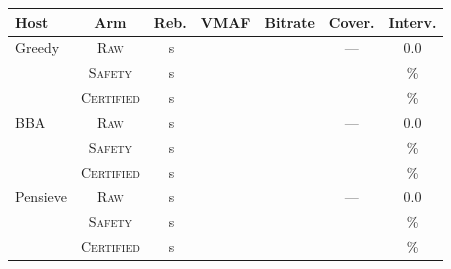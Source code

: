\begin{tabularx}{\linewidth}{@{}>{\raggedright\arraybackslash}X c ccccc@{}}
\toprule
\textbf{Host} & \textbf{Arm} & \textbf{Reb.} & \textbf{VMAF} & \textbf{Bitrate} & \textbf{Cover.} & \textbf{Interv.} \\
\midrule
Greedy & \textsc{Raw} & \CPSGreedyRawReb{}\,s & \CPSGreedyRawVM{} & \CPSGreedyRawBr{} & --- & 0.0\\
 & \textsc{Safety} & \CPSGreedySafReb{}\,s & \CPSGreedySafVM{} & \CPSGreedySafBr{} & \CPSGreedySafCov{} & \CPSGreedySafInt{}\%\\
 & \textsc{Certified} & \CPSGreedyCertReb{}\,s & \CPSGreedyCertVM{} & \CPSGreedyCertBr{} & \CPSGreedyCertCov{} & \CPSGreedyCertInt{}\%\\
\midrule
BBA & \textsc{Raw} & \CPSBbaRawReb{}\,s & \CPSBbaRawVM{} & \CPSBbaRawBr{} & --- & 0.0\\
 & \textsc{Safety} & \CPSBbaSafReb{}\,s & \CPSBbaSafVM{} & \CPSBbaSafBr{} & \CPSBbaSafCov{} & \CPSBbaSafInt{}\%\\
 & \textsc{Certified} & \CPSBbaCertReb{}\,s & \CPSBbaCertVM{} & \CPSBbaCertBr{} & \CPSBbaCertCov{} & \CPSBbaCertInt{}\%\\
\midrule
Pensieve & \textsc{Raw} & \CPSPenRawReb{}\,s & \CPSPenRawVM{} & \CPSPenRawBr{} & --- & 0.0\\
 & \textsc{Safety} & \CPSPenSafReb{}\,s & \CPSPenSafVM{} & \CPSPenSafBr{} & \CPSPenSafCov{} & \CPSPenSafInt{}\%\\
 & \textsc{Certified} & \CPSPenCertReb{}\,s & \CPSPenCertVM{} & \CPSPenCertBr{} & \CPSPenCertCov{} & \CPSPenCertInt{}\%\\
\bottomrule
\end{tabularx}
